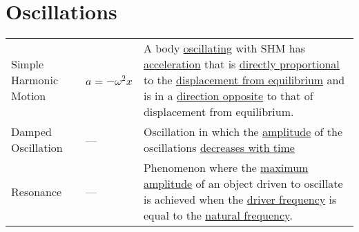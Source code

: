 \documentclass[a4paper]{article}
\begin{document}
	\section{Oscillations}
		\begin{center}
			\renewcommand{\arraystretch}{1.2}
			\begin{tabular}{@{} l l p{8cm} @{}}
				\toprule
				Simple Harmonic Motion & $a=-\omega^2x$ & A body \underline{oscillating} with SHM has \underline{acceleration} that is \underline{directly proportional} to the \underline{displacement from equilibrium} and is in a \underline{direction opposite} to that of displacement from equilibrium. \\
				Damped Oscillation & ---  & Oscillation in which the  \underline{amplitude} of the oscillations \underline{decreases with time} \\
				Resonance & --- & Phenomenon where the \underline{maximum amplitude} of an object driven to oscillate is achieved when the \underline{driver frequency} is equal to the \underline{natural frequency}. \\
				\bottomrule
			\end{tabular}
		\end{center}
\end{document}

